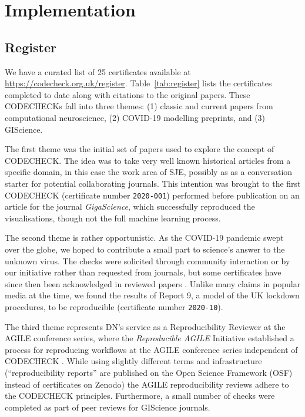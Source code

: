 \documentclass[12pt]{article}
\begin{document}
\section*{Implementation}\label{implementation}

\subsection*{Register}\label{register}

We have a curated list of 25 certificates available at
\url{https://codecheck.org.uk/register}.
Table~\ref{tab:register} lists the certificates completed to date
along with citations to the original papers.
These CODECHECKs fall into three themes:
(1) classic and current papers from computational neuroscience,
(2) COVID-19 modelling preprints, and
(3) GIScience.

The first theme was the initial set of papers used to explore the concept
of CODECHECK. 
The idea was to take very well known historical articles from a 
specific domain, in this case the work area of SJE, possibly 
as as a conversation starter for potential collaborating journals.
This intention was brought to the first CODECHECK (certificate number
\texttt{2020-001}) performed before publication on an article for the journal
\emph{GigaScience}, which successfully reproduced the visualisations,
though not the full machine learning process.

The second theme is rather opportunistic. As the COVID-19 pandemic swept
over the globe, we hoped to contribute a small part to science's answer
to the unknown virus. The checks were solicited through community interaction
or by our initiative rather than requested from journals, but some certificates
have since then been acknowledged in reviewed papers
\cite{Davies2020-vj,kucharski_effectiveness_2020}. Unlike many claims in
popular media at the time,
we found the results of Report 9, a model of the UK lockdown procedures,
to be reproducible (certificate number \texttt{2020-10}).

The third theme represents DN's service as a Reproducibility Reviewer at the AGILE conference series, where the \emph{Reproducible AGILE} Initiative \cite{reproducible_agile} established a process for reproducing workflows at the AGILE conference series independent of CODECHECK \cite{nust_improving_2020}.
While using slightly different terms and infrastructure (``reproducibility
reports'' are published on the Open Science Framework (OSF) instead of certificates on Zenodo) the 
AGILE reproducibility reviews adhere to the CODECHECK principles.
Furthermore, a small number of checks were completed as part of peer reviews
for GIScience journals.
\end{document}
